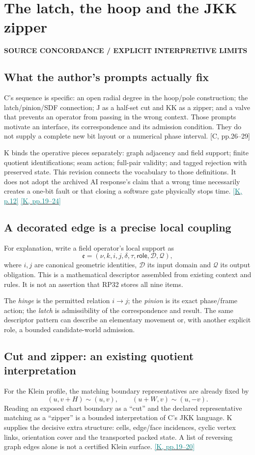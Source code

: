 \documentclass[11pt,a4paper]{article}
\newcommand{\kref}[1]{\hyperlink{baseline.#1}{\textcolor{teal}{[K, p.#1]}}}
\newcommand{\krange}[2]{\hyperlink{baseline.#1}{\textcolor{teal}{[K, pp.#1--#2]}}}
\newcommand{\crefrange}[2]{\textcolor{muted}{[C, pp.#1--#2]}}
\newcommand{\status}[1]{{\sffamily\bfseries\scriptsize\color{teal}#1}\par}
\newcommand{\sectionstart}[1]{\par\addvspace{18pt}\Needspace{12\baselineskip}\section{#1}}
\theoremstyle{lpstyle}
\begin{document}
\sectionstart{The latch, the hoop and the JKK zipper}
\status{SOURCE CONCORDANCE / EXPLICIT INTERPRETIVE LIMITS}
\subsection{What the author's prompts actually fix}
C's sequence is specific: an open radial degree in the hoop/pole construction; the latch/pinion/SDF connection; J as a half-set cut and KK as a zipper; and a valve that prevents an operator from passing in the wrong context. Those prompts motivate an interface, its correspondence and its admission condition. They do not supply a complete new bit layout or a numerical phase interval. \crefrange{26}{29}

K binds the operative pieces separately: graph adjacency and field support; finite quotient identifications; seam action; full-pair validity; and tagged rejection with preserved state. This revision connects the vocabulary to those definitions. It does not adopt the archived AI response's claim that a wrong time necessarily creates a one-bit fault or that closing a software gate physically stops time. \kref{12} \krange{19}{24}

\subsection{A decorated edge is a precise local coupling}
For explanation, write a field operator's local support as
\[
\mathfrak e=(\nu,k,i,j,\delta,\tau,\mathsf{role},\mathcal D,\mathcal Q),
\]
where $i,j$ are canonical geometric identities, $\mathcal D$ its input domain and $\mathcal Q$ its output obligation. This is a mathematical descriptor assembled from existing context and rules. It is not an assertion that RP32 stores all nine items.

The \emph{hinge} is the permitted relation $i\to j$; the \emph{pinion} is its exact phase/frame action; the \emph{latch} is admissibility of the correspondence and result. The same descriptor pattern can describe an elementary movement or, with another explicit role, a bounded candidate-world admission.

\subsection{Cut and zipper: an existing quotient interpretation}
For the Klein profile, the matching boundary representatives are already fixed by
\[
(u,v+H)\sim(u,v),\qquad (u+W,v)\sim(u,-v).
\]
Reading an exposed chart boundary as a ``cut'' and the declared representative matching as a ``zipper'' is a bounded interpretation of C's JKK language. K supplies the decisive extra structure: cells, edge/face incidences, cyclic vertex links, orientation cover and the transported packed state. A list of reversing graph edges alone is not a certified Klein surface. \krange{19}{20}
\end{document}
